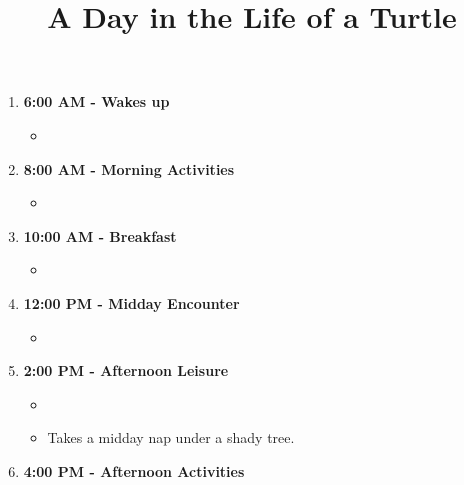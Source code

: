 \documentclass{article}
\title{A Day in the Life of a Turtle}
\date{}
\begin{document}
\maketitle

\begin{enumerate}
\item \textbf{6:00 AM - Wakes up}
\begin{itemize}
\item %
\end{itemize}
\item \textbf{8:00 AM - Morning Activities}
\begin{itemize}
\item %
\end{itemize}
\item \textbf{10:00 AM - Breakfast}
\begin{itemize}
\item %
\end{itemize}
\item \textbf{12:00 PM - Midday Encounter}
\begin{itemize}
\item %
\end{itemize}
\item \textbf{2:00 PM - Afternoon Leisure}
\begin{itemize}
\item %
\item Takes a midday nap under a shady tree.
\end{itemize}
\item \textbf{4:00 PM - Afternoon Activities}

\end{enumerate}
\end{document}
